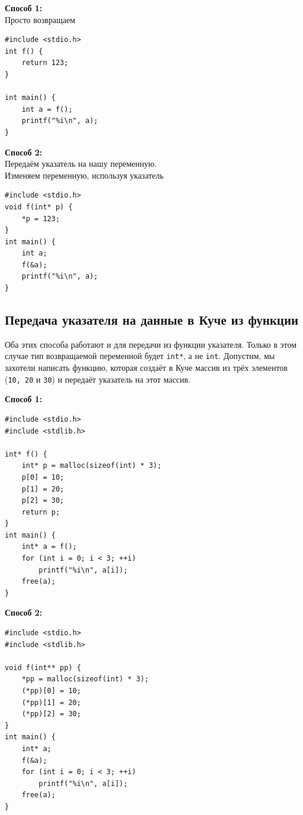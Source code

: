 \documentclass{article}
\begin{document}
\begin{multicols}{2}
\textbf{Способ 1:}\\
Просто возвращаем
\begin{lstlisting}
#include <stdio.h>
int f() {
    return 123;
}

int main() {
    int a = f();
    printf("%i\n", a);
}
\end{lstlisting}

\columnbreak

\textbf{Способ 2:}\\
Передаём указатель на нашу переменную.\\
Изменяем переменную, используя указатель
\begin{lstlisting}
#include <stdio.h>
void f(int* p) {
    *p = 123;
}
int main() {
    int a;
    f(&a);
    printf("%i\n", a);
}
\end{lstlisting}
\end{multicols}


\subsection*{Передача указателя на данные в Куче из функции}
Оба этих способа работают и для передачи из функции указателя. Только в этом случае тип возвращаемой переменной будет \texttt{int*}, а не \texttt{int}. Допустим, мы захотели написать функцию, которая создаёт в Куче массив из трёх элементов (\texttt{10, 20} и \texttt{30}) и передаёт указатель на этот массив.
\begin{multicols}{2}
\textbf{Способ 1:}
\begin{lstlisting}
#include <stdio.h>
#include <stdlib.h>

int* f() {
    int* p = malloc(sizeof(int) * 3);
    p[0] = 10;
    p[1] = 20;
    p[2] = 30;
    return p;
}
int main() {
    int* a = f();
    for (int i = 0; i < 3; ++i)
        printf("%i\n", a[i]);
    free(a);
}
\end{lstlisting}

\columnbreak

\textbf{Способ 2:}
\begin{lstlisting}
#include <stdio.h>
#include <stdlib.h>

void f(int** pp) {
    *pp = malloc(sizeof(int) * 3);
    (*pp)[0] = 10;
    (*pp)[1] = 20;
    (*pp)[2] = 30;
}
int main() {
    int* a;
    f(&a);
    for (int i = 0; i < 3; ++i)
        printf("%i\n", a[i]);
    free(a);
}
\end{lstlisting}
\end{multicols}
\end{document}
